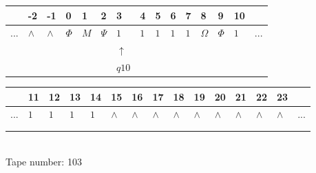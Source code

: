 \documentclass[11pt]{article}
\begin{document}
\begin{table}[H]
\centering
\begin{tabular}{lllllllllllllll}
 & -2 & -1 & 0 & 1 & 2 & 3 & 4 & 5 & 6 & 7 & 8 & 9 & 10 & \\
\hline
$...$ & \multicolumn{1}{|l|}{$\wedge$} & \multicolumn{1}{|l|}{$\wedge$} & \multicolumn{1}{|l|}{$\Phi$} & \multicolumn{1}{|l|}{$M$} & \multicolumn{1}{|l|}{$\Psi$} & \multicolumn{1}{|l|}{$1$} & \multicolumn{1}{|l|}{$1$} & \multicolumn{1}{|l|}{$1$} & \multicolumn{1}{|l|}{$1$} & \multicolumn{1}{|l|}{$1$} & \multicolumn{1}{|l|}{$\Omega$} & \multicolumn{1}{|l|}{$\Phi$} & \multicolumn{1}{|l|}{$1$} & $...$\\
\hline
&  &  &  &  &  & $\uparrow$ &  &  &  &  &  &  &  &  \\
&  &  &  &  &  & $ q10 $ &  &  &  &  &  &  &  &  \\
\end{tabular}
\begin{tabular}{lllllllllllllll}
 & 11 & 12 & 13 & 14 & 15 & 16 & 17 & 18 & 19 & 20 & 21 & 22 & 23 & \\
\hline
$...$ & \multicolumn{1}{|l|}{$1$} & \multicolumn{1}{|l|}{$1$} & \multicolumn{1}{|l|}{$1$} & \multicolumn{1}{|l|}{$1$} & \multicolumn{1}{|l|}{$\wedge$} & \multicolumn{1}{|l|}{$\wedge$} & \multicolumn{1}{|l|}{$\wedge$} & \multicolumn{1}{|l|}{$\wedge$} & \multicolumn{1}{|l|}{$\wedge$} & \multicolumn{1}{|l|}{$\wedge$} & \multicolumn{1}{|l|}{$\wedge$} & \multicolumn{1}{|l|}{$\wedge$} & \multicolumn{1}{|l|}{$\wedge$} & $...$\\
\hline
&  &  &  &  &  &  &  &  &  &  &  &  &  &  \\
&  &  &  &  &  &  &  &  &  &  &  &  &  &  \\
\end{tabular}
\\
Tape number: 103
\noindent\makebox[\linewidth]{\hdashrule{\textwidth}{1pt}{1pt}}\end{table}
\clearpage
\end{document}
